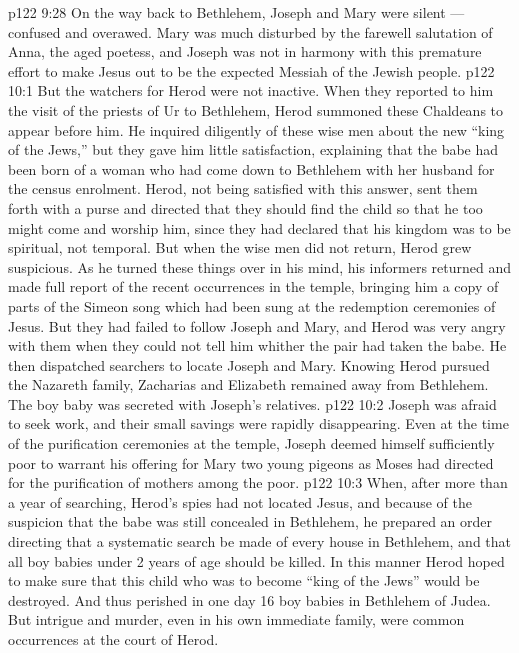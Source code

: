 \vs p122 9:28 \pc On the way back to Bethlehem, Joseph and Mary were silent --- confused and overawed. Mary was much disturbed by the farewell salutation of Anna, the aged poetess, and Joseph was not in harmony with this premature effort to make Jesus out to be the expected Messiah of the Jewish people.
\vs p122 10:1 But the watchers for Herod were not inactive. When they reported to him the visit of the priests of Ur to Bethlehem, Herod summoned these Chaldeans to appear before him. He inquired diligently of these wise men about the new “king of the Jews,” but they gave him little satisfaction, explaining that the babe had been born of a woman who had come down to Bethlehem with her husband for the census enrolment. Herod, not being satisfied with this answer, sent them forth with a purse and directed that they should find the child so that he too might come and worship him, since they had declared that his kingdom was to be spiritual, not temporal. But when the wise men did not return, Herod grew suspicious. As he turned these things over in his mind, his informers returned and made full report of the recent occurrences in the temple, bringing him a copy of parts of the Simeon song which had been sung at the redemption ceremonies of Jesus. But they had failed to follow Joseph and Mary, and Herod was very angry with them when they could not tell him whither the pair had taken the babe. He then dispatched searchers to locate Joseph and Mary. Knowing Herod pursued the Nazareth family, Zacharias and Elizabeth remained away from Bethlehem. The boy baby was secreted with Joseph’s relatives.
\vs p122 10:2 Joseph was afraid to seek work, and their small savings were rapidly disappearing. Even at the time of the purification ceremonies at the temple, Joseph deemed himself sufficiently poor to warrant his offering for Mary two young pigeons as Moses had directed for the purification of mothers among the poor.
\vs p122 10:3 When, after more than a year of searching, Herod’s spies had not located Jesus, and because of the suspicion that the babe was still concealed in Bethlehem, he prepared an order directing that a systematic search be made of every house in Bethlehem, and that all boy babies under 2 years of age should be killed. In this manner Herod hoped to make sure that this child who was to become “king of the Jews” would be destroyed. And thus perished in one day 16 boy babies in Bethlehem of Judea. But intrigue and murder, even in his own immediate family, were common occurrences at the court of Herod.
